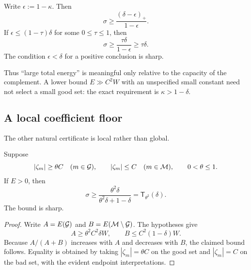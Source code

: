 \begin{corollary}
\label{cor:tpc54-defect}
Write \(\epsilon:=1-\kappa\).  Then
\begin{equation}
 \sigma\ge\frac{(\delta-\epsilon)_+}{1-\epsilon}.
 \label{eq:tpc54-defect-bound}
\end{equation}
If \(\epsilon\le(1-\tau)\delta\) for some \(0\le\tau\le1\), then
\begin{equation}
 \sigma\ge\frac{\tau\delta}{1-\epsilon}
 \ge\tau\delta.
 \label{eq:tpc54-defect-tau}
\end{equation}
The condition \(\epsilon<\delta\) for a positive conclusion is sharp.
\end{corollary}

Thus ``large total energy'' is meaningful only relative to the capacity
of the complement.  A lower bound \(E\gg C^2W\) with an unspecified small
constant need not select a small good set: the exact requirement is
\(\kappa>1-\delta\).

\subsection{A local coefficient floor}

The other natural certificate is local rather than global.

\begin{theorem}
\label{thm:tpc54-floor}
Suppose
\begin{equation}
 |\zeta_m|\ge\theta C\quad(m\in\mathcal G),
 \qquad |\zeta_m|\le C\quad(m\in\mathcal M),
 \qquad 0<\theta\le1.
 \label{eq:tpc54-floor-hyp}
\end{equation}
If \(E>0\), then
\begin{equation}
 \boxed{\quad
 \sigma\ge
 \frac{\theta^2\delta}
      {\theta^2\delta+1-\delta}
 =\mathsf T_{\theta^2}(\delta).
 \quad}
 \label{eq:tpc54-floor-bound}
\end{equation}
The bound is sharp.
\end{theorem}

\begin{proof}
Write \(A=E(\mathcal G)\) and \(B=E(\mathcal M\setminus\mathcal G)\).  The hypotheses give
\[
 A\ge\theta^2C^2\delta W,
 \qquad B\le C^2(1-\delta)W.
\]
Because \(A/(A+B)\) increases with \(A\) and decreases with \(B\), the
claimed bound follows.  Equality is obtained by taking
\(|\zeta_m|=\theta C\) on the good set and \(|\zeta_m|=C\) on the bad
set, with the evident endpoint interpretations.
\end{proof}

